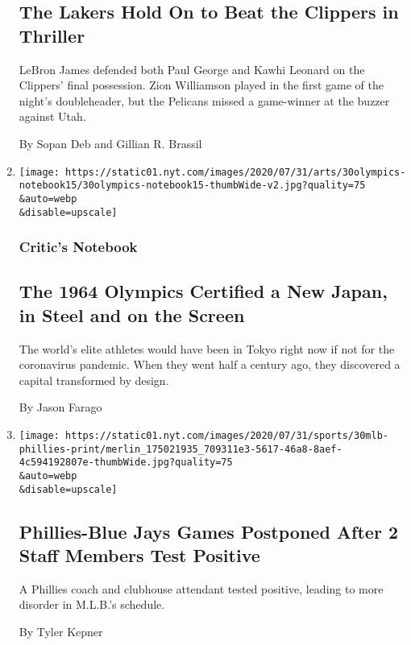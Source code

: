 \begin{enumerate}
  \hypertarget{the-lakers-hold-on-to-beat-the-clippers-in-thriller}{%
  \subsection{The Lakers Hold On to Beat the Clippers in
  Thriller}\label{the-lakers-hold-on-to-beat-the-clippers-in-thriller}}

  LeBron James defended both Paul George and Kawhi Leonard on the
  Clippers' final possession. Zion Williamson played in the first game
  of the night's doubleheader, but the Pelicans missed a game-winner at
  the buzzer against Utah.

  By Sopan Deb and Gillian R. Brassil
\item
  \href{/2020/07/30/arts/design/tokyo-olympics-1964-design.html}{}

  \texttt{[image: https://static01.nyt.com/images/2020/07/31/arts/30olympics-notebook15/30olympics-notebook15-thumbWide-v2.jpg?quality=75\\\&auto=webp\\\&disable=upscale]}

  \hypertarget{critics-notebook}{%
  \subsubsection{Critic's Notebook}\label{critics-notebook}}

  \hypertarget{the-1964-olympics-certified-a-new-japan-in-steel-and-on-the-screen}{%
  \subsection{The 1964 Olympics Certified a New Japan, in Steel and on
  the
  Screen}\label{the-1964-olympics-certified-a-new-japan-in-steel-and-on-the-screen}}

  The world's elite athletes would have been in Tokyo right now if not
  for the coronavirus pandemic. When they went half a century ago, they
  discovered a capital transformed by design.

  By Jason Farago
\item
  \href{/2020/07/30/sports/baseball/phillies-blue-jays-postponed-coronavirus.html}{}

  \texttt{[image: https://static01.nyt.com/images/2020/07/31/sports/30mlb-phillies-print/merlin\_175021935\_709311e3-5617-46a8-8aef-4c594192807e-thumbWide.jpg?quality=75\\\&auto=webp\\\&disable=upscale]}

  \hypertarget{phillies-blue-jays-games-postponed-after-2-staff-members-test-positive}{%
  \subsection{Phillies-Blue Jays Games Postponed After 2 Staff Members
  Test
  Positive}\label{phillies-blue-jays-games-postponed-after-2-staff-members-test-positive}}

  A Phillies coach and clubhouse attendant tested positive, leading to
  more disorder in M.L.B.'s schedule.

  By Tyler Kepner
\end{enumerate}


